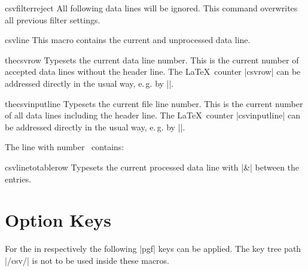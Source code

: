 \documentclass[a4paper,11pt]{ltxdoc}
\begin{document}
\begin{docCommand}{csvfilterreject}{}
  All following data lines will be ignored.
  This command overwrites all previous filter settings.
\end{docCommand}


\begin{docCommand}{csvline}{}
  This macro contains the current and unprocessed data line.
\begin{dispExample}
%
\end{dispExample}
\end{docCommand}


\begin{docCommand}{thecsvrow}{}
  Typesets the current data line number. This is the
  current number of accepted data lines without the header line.
  The \LaTeX\ counter |csvrow| can be addressed directly in the usual way,
  e.\,g. by ||.
\end{docCommand}


\begin{docCommand}{thecsvinputline}{}
  Typesets the current file line number. This is the
  current number of all data lines including the header line.
  The \LaTeX\ counter |csvinputline| can be addressed directly in the usual way,
  e.\,g. by ||.
\begin{dispExample}
%
  {The line with number \thecsvinputline\ contains: \csvline}%
\end{dispExample}
\end{docCommand}


\begin{docCommand}[doc updated=2016-07-01]{csvlinetotablerow}{}
  Typesets the current processed data line with |&| between the entries.
\end{docCommand}



\clearpage
\section{Option Keys}\label{sec:schluessel}%
For the  in  respectively 
the following |pgf| keys can be applied. The key tree path |/csv/| is not
to be used inside these macros.
\end{document}

